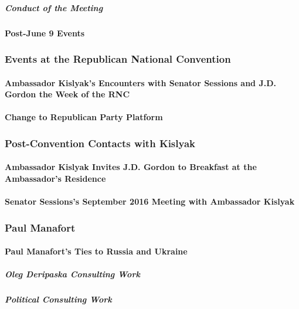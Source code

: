\subparagraph{Conduct of the Meeting}

\paragraph{Post-June 9 Events}

\subsubsection{Events at the Republican National Convention}

\paragraph{Ambassador Kislyak's Encounters with Senator Sessions and J.D. Gordon the Week of the RNC}

\paragraph{Change to Republican Party Platform}

\subsubsection{Post-Convention Contacts with Kislyak}

\paragraph{Ambassador Kislyak Invites J.D. Gordon to Breakfast at the Ambassador's Residence}

\paragraph{Senator Sessions's September 2016 Meeting with Ambassador Kislyak}

\subsubsection{Paul Manafort}

\paragraph{Paul Manafort's Ties to Russia and Ukraine}

\subparagraph{Oleg Deripaska Consulting Work}

\subparagraph{Political Consulting Work}

